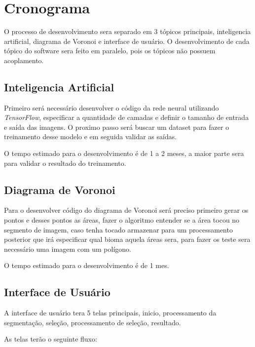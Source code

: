 \section{Cronograma}

O processo de desenvolvimento sera separado em 3 tópicos principais, inteligencia artificial, diagrama de Voronoi e interface de usuário. O desenvolvimento de cada tópico do software sera feito em paralelo, pois os tópicos não possuem acoplamento.

\subsection*{Inteligencia Artificial}

Primeiro será necessário desenvolver o código da rede neural utilizando \textit{TensorFlow}, especificar a quantidade de camadas e definir o tamanho de entrada e saída das imagens.
O proximo passo será buscar um dataset para fazer o treinamento desse modelo e em seguida validar as saídas.

O tempo estimado para o desenvolvimento é de 1 a 2 meses, a maior parte sera para validar o resultado do treinamento.

\subsection*{Diagrama de Voronoi}

Para o desenvolver código do diagrama de Voronoi será preciso primeiro gerar os pontos e desses pontos as áreas, fazer o algoritmo entender se a área tocou no segmento de imagem, caso tenha tocado armazenar para um processamento posterior que irá especificar qual bioma aquela áreas sera, para fazer os teste sera necessário uma imagem com um polígono.

O tempo estimado para o desenvolvimento é de 1 mes.

\subsection*{Interface de Usuário}

A interface de usuário tera 5 telas principais, inicio, processamento da segmentação, seleção, processamento de seleção, resultado. 

As telas terão o seguinte fluxo:

